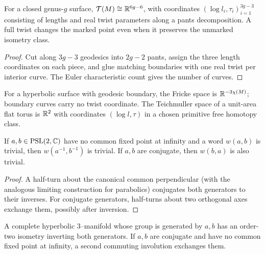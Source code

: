 \begin{theorem}
\label{thurston-ch05-fenchel-nielsen}
For a closed genus-$g$ surface, $\mathcal T(M)\cong\mathbb{R}^{6g-6}$, with coordinates $(\log l_i,\tau_i)_{i=1}^{3g-3}$ consisting of lengths and real twist parameters along a pants decomposition.  A full twist changes the marked point even when it preserves the unmarked isometry class.
\end{theorem}
\begin{proof}\sketch Cut along $3g-3$ geodesics into $2g-2$ pants, assign the three length coordinates on each piece, and glue matching boundaries with one real twist per interior curve.  The Euler characteristic count gives the number of curves.\end{proof}

\begin{theorem}
\label{thurston-ch05-fricke-torus-coordinates}
For a hyperbolic surface with geodesic boundary, the Fricke space is $\mathbb{R}^{-3\chi(M)}$; boundary curves carry no twist coordinate.  The Teichmuller space of a unit-area flat torus is $\mathbb{R}^2$ with coordinates $(\log l,\tau)$ in a chosen primitive free homotopy class.
\end{theorem}

\begin{proposition}
\label{thurston-ch05-jorgensen-word-symmetries}
If $a,b\in\operatorname{PSL}(2,\mathbb{C})$ have no common fixed point at infinity and a word $w(a,b)$ is trivial, then $w(a^{-1},b^{-1})$ is trivial.  If $a,b$ are conjugate, then $w(b,a)$ is also trivial.
\end{proposition}
\begin{proof}\sketch A half-turn about the canonical common perpendicular (with the analogous limiting construction for parabolics) conjugates both generators to their inverses.  For conjugate generators, half-turns about two orthogonal axes exchange them, possibly after inversion.\end{proof}

\begin{corollary}
\label{thurston-ch05-two-generator-involutions}
A complete hyperbolic $3$--manifold whose group is generated by $a,b$ has an order-two isometry inverting both generators.  If $a,b$ are conjugate and have no common fixed point at infinity, a second commuting involution exchanges them.
\end{corollary}

